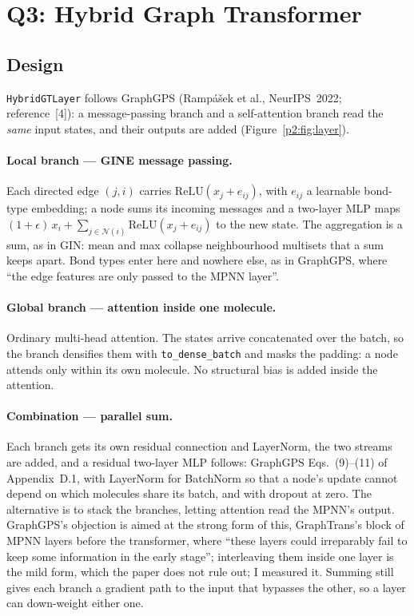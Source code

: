 \section{Q3: Hybrid Graph Transformer}

\subsection*{Design}

\texttt{HybridGTLayer} follows GraphGPS (Ramp\'a\v{s}ek et al., NeurIPS~2022;
reference~[4]): a message-passing branch and a self-attention branch read the \emph{same}
input states, and their outputs are added (Figure~\ref{p2:fig:layer}).

\paragraph{Local branch --- GINE message passing.}
Each directed edge $(j,i)$ carries $\mathrm{ReLU}(x_j + e_{ij})$, with $e_{ij}$ a learnable
bond-type embedding; a node sums its incoming messages and a two-layer MLP maps
$(1+\epsilon)\,x_i + \sum_{j \in \mathcal{N}(i)} \mathrm{ReLU}(x_j + e_{ij})$ to the new
state. The aggregation is a sum, as in GIN: mean and max collapse neighbourhood
multisets that a sum keeps apart. Bond
types enter here and nowhere else, as in GraphGPS, where ``the edge features are only passed
to the MPNN layer''.

\paragraph{Global branch --- attention inside one molecule.}
Ordinary multi-head attention. The states arrive concatenated over the batch, so the branch
densifies them with \texttt{to\_dense\_batch} and masks the padding: a node attends only
within its own molecule. No structural bias is added inside the attention.

\paragraph{Combination --- parallel sum.}
Each branch gets its own residual connection and LayerNorm, the two streams are added, and a
residual two-layer MLP follows: GraphGPS Eqs.~(9)--(11) of Appendix~D.1, with LayerNorm for
BatchNorm so that a node's update cannot depend on which molecules share its batch, and with
dropout at zero. The alternative is to stack the branches, letting attention read the MPNN's
output. GraphGPS's objection is aimed at the strong form of this, GraphTrans's block of MPNN
layers before the transformer, where ``these layers could irreparably fail to keep some
information in the early stage''; interleaving them inside one layer is the mild form, which
the paper does not rule out; I measured it. Summing still gives each branch a gradient path
to the input that bypasses the other, so a layer can down-weight either one.

